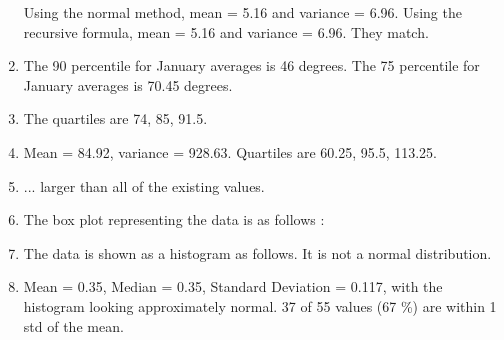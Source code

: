 \begin{enumerate}
	Using the normal method, mean = 5.16 and variance = 6.96.
	Using the recursive formula, mean = 5.16 and variance = 6.96. They match.
	
	\item The 90 percentile for January averages is 46 degrees.
	The 75 percentile for January averages is 70.45 degrees.
	
	\item The quartiles are 74, 85, 91.5.
	
	\item Mean = 84.92, variance = 928.63.
	Quartiles are 60.25, 95.5, 113.25.
	
	\item ... larger than all of the existing values.
	
	\item The box plot representing the data is as follows : \\
	
	\begin{figure}[H]
		\centering
	\end{figure}
	
	\item The data is shown as a histogram as follows. It is not a normal distribution.
	
	\begin{figure}[H]
		\centering
	\end{figure} 
	
	
	\item Mean = 0.35, Median = 0.35, Standard Deviation = 0.117, with the histogram looking approximately normal.
	37 of 55 values (67 \%) are within 1 std of the mean.
	

\end{enumerate}

